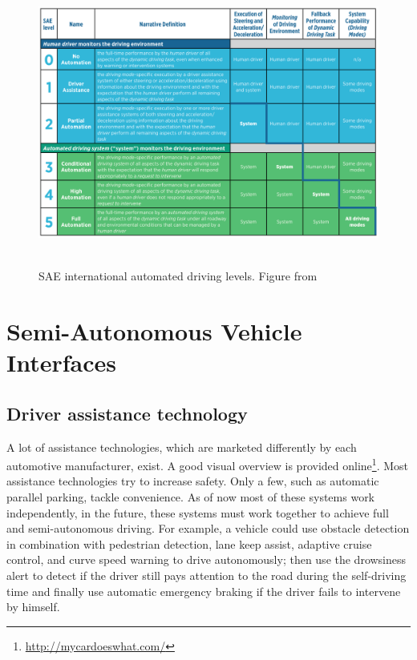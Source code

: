 \begin{figure}
    \includegraphics[width=1\textwidth]{fig/SAE}\hfill\
    \caption[SAE international automated driving levels]{SAE international automated driving levels. Figure from \cite{SAEinternational2016}}
    \label{fig:SAE}
\end{figure}

\section{Semi-Autonomous Vehicle Interfaces}
\subsection{Driver assistance technology}
\label{ssec:driverassistance}
A lot of assistance technologies, which are marketed differently by each automotive manufacturer, exist. A good visual overview is provided online\footnote{\url{http://mycardoeswhat.com/}}. Most assistance technologies try to increase safety. Only a few, such as automatic parallel parking, tackle convenience. As of now most of these systems work independently, in the future, these systems must work together to achieve full and semi-autonomous driving. For example, a vehicle could use obstacle detection in combination with pedestrian detection, lane keep assist, adaptive cruise control, and curve speed warning to drive autonomously; then use the drowsiness alert to detect if the driver still pays attention to the road during the self-driving time and finally use automatic emergency braking if the driver fails to intervene by himself. 

